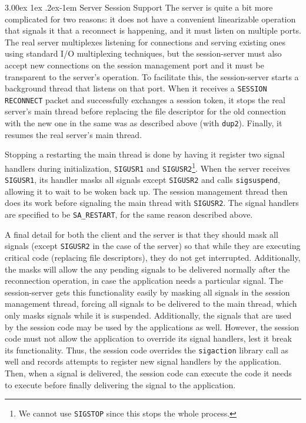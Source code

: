 \documentclass[twocolumn,11pt]{article}
\makeatletter
\renewcommand{\paragraph}{%
  \@startsection{paragraph}{4}%
  {\z@}{3.00ex \@plus 1ex \@minus .2ex}{-1em}%
  {\normalfont\normalsize\bfseries}%
}
\makeatother
\begin{document}
\paragraph{Server Session Support}
The server is quite a bit more complicated for two reasons: it does not have a
convenient linearizable operation that signals it that a reconnect is happening,
and it must listen on multiple ports.
The real server multiplexes listening for connections and serving existing ones
using standard I/O multiplexing techniques,
but the session-server must also accept new connections
on the session management port and it must be transparent to the server's
operation. To facilitate this, the session-server starts a
background thread that listens on that port. When it receives a \texttt{SESSION
RECONNECT} packet and successfully exchanges a session token, it stops the real
server's main thread before replacing the file descriptor for the old connection
with the new one in the same was as described above (with \texttt{dup2}).
Finally, it resumes the real server's main thread.

Stopping a restarting the main thread is done by having it register two signal
handlers during initialization, \texttt{SIGUSR1} and
\texttt{SIGUSR2}\footnote{We cannot use \texttt{SIGSTOP} since this stops the
whole process.}. When the
server receives \texttt{SIGUSR1}, its handler masks all signals except
\texttt{SIGUSR2} and calls \texttt{sigsuspend}, allowing it to wait to be woken
back up. The session management thread then does its work before signaling the
main thread with \texttt{SIGUSR2}. The signal handlers are specified to be
\texttt{SA\_RESTART}, for the same reason described above.

A final detail for both the client and the server is that they should mask all
signals (except \texttt{SIGUSR2} in the case of the server) so that while they
are executing critical code (replacing file descriptors), they do not get
interrupted. Additionally, the masks will allow the any pending signals to be delivered
normally after the reconnection operation, in case the application needs a
particular signal. The session-server gets this functionality easily by masking
all signals in the session management thread, forcing all signals to be
delivered to the main thread, which only masks signals while it is suspended.
Additionally, the signals that are used by the session code may be used
by the applications as well. However, the session code must not allow the
application to override its signal handlers, lest it break its functionality.
Thus, the session code overrides the \texttt{sigaction} library call as well and
records attempts to register new signal handlers by the application. Then, when
a signal is delivered, the session code can execute the code it needs to execute
before finally delivering the signal to the application.
\end{document}

